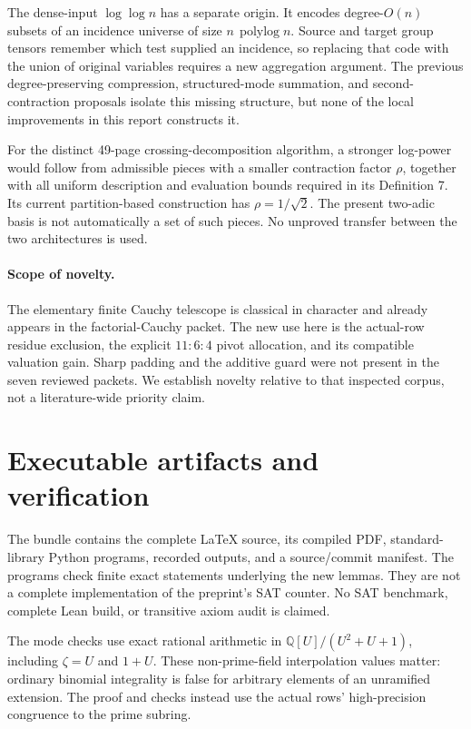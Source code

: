\documentclass[11pt,letterpaper]{article}
\theoremstyle{definition}\newtheorem{definition}[theorem]{Definition}
\theoremstyle{remark}\newtheorem{remark}[theorem]{Remark}
\newcommand{\polylog}{\operatorname{polylog}}
\newcommand{\Q}{\mathbb Q}
\begin{document}
The dense-input $\log\log n$ has a separate origin. It encodes
degree-$O(n)$ subsets of an incidence universe of size
$n\,\polylog n$. Source and target group tensors remember which
test supplied an incidence, so replacing that code with the union
of original variables requires a new aggregation argument. The
previous degree-preserving compression, structured-mode summation,
and second-contraction proposals isolate this missing structure,
but none of the local improvements in this report constructs it.

For the distinct 49-page crossing-decomposition algorithm, a
stronger log-power would follow from admissible pieces with a
smaller contraction factor $\rho$, together with all uniform
description and evaluation bounds required in its Definition 7.
Its current partition-based construction has $\rho=1/\sqrt2$.
The present two-adic basis is not automatically a set of such
pieces. No unproved transfer between the two architectures is used.

\paragraph{Scope of novelty.}
The elementary finite Cauchy telescope is classical in character and
already appears in the factorial-Cauchy packet. The new use here is
the actual-row residue exclusion, the explicit $11{:}6{:}4$ pivot
allocation, and its compatible valuation gain. Sharp padding and
the additive guard were not present in the seven reviewed packets.
We establish novelty relative to that inspected corpus, not a
literature-wide priority claim.

\section{Executable artifacts and verification}\label{sec:checks}
The bundle contains the complete LaTeX source, its compiled PDF,
standard-library Python programs, recorded outputs, and a source/commit
manifest. The programs check finite exact statements underlying the new
lemmas. They are not a complete implementation of the preprint's SAT
counter. No SAT benchmark, complete Lean build, or transitive axiom
audit is claimed.



The mode checks use exact rational arithmetic in
$\Q[U]/(U^2+U+1)$, including $\zeta=U$ and $1+U$. These
non-prime-field interpolation values matter: ordinary binomial
integrality is false for arbitrary elements of an unramified
extension. The proof and checks instead use the actual rows'
high-precision congruence to the prime subring.
\end{document}
